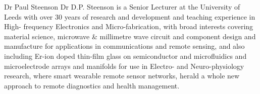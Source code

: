 \documentclass{ieeeaccess}
\begin{document}
\begin{IEEEbiography}{Dr Paul Steenson} Dr D.P. Steenson is a Senior Lecturer at the University of Leeds with over 30 years of research and development and teaching experience in High- frequency Electronics and Micro-fabrication, with broad interests covering material science, microwave \& millimetre wave circuit and component design and manufacture for applications in communications and remote sensing, and also including Er-ion doped thin-film glass on semiconductor and microfluidics and microelectrode arrays and manifolds for use in Electro- and Neuro-physiology research, where smart wearable remote sensor networks, herald a whole new approach to remote diagnostics and health management. 
\end{IEEEbiography}

\EOD
\end{document}
